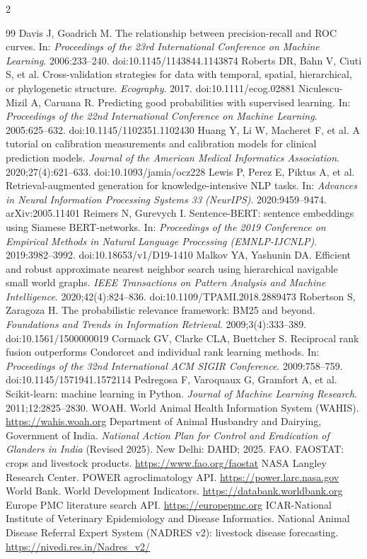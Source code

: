 \documentclass[10pt,openany]{report}
\begin{document}
\begin{multicols}{2}
\begin{thebibliography}{99}
 Davis J, Goadrich M. The relationship between precision-recall and ROC curves. In: \emph{Proceedings of the 23rd International Conference on Machine Learning}. 2006:233--240. doi:10.1145/1143844.1143874
 Roberts DR, Bahn V, Ciuti S, et al. Cross-validation strategies for data with temporal, spatial, hierarchical, or phylogenetic structure. \emph{Ecography}. 2017. doi:10.1111/ecog.02881
 Niculescu-Mizil A, Caruana R. Predicting good probabilities with supervised learning. In: \emph{Proceedings of the 22nd International Conference on Machine Learning}. 2005:625--632. doi:10.1145/1102351.1102430
 Huang Y, Li W, Macheret F, et al. A tutorial on calibration measurements and calibration models for clinical prediction models. \emph{Journal of the American Medical Informatics Association}. 2020;27(4):621--633. doi:10.1093/jamia/ocz228
 Lewis P, Perez E, Piktus A, et al. Retrieval-augmented generation for knowledge-intensive NLP tasks. In: \emph{Advances in Neural Information Processing Systems 33 (NeurIPS)}. 2020:9459--9474. arXiv:2005.11401
 Reimers N, Gurevych I. Sentence-BERT: sentence embeddings using Siamese BERT-networks. In: \emph{Proceedings of the 2019 Conference on Empirical Methods in Natural Language Processing (EMNLP-IJCNLP)}. 2019:3982--3992. doi:10.18653/v1/D19-1410
 Malkov YA, Yashunin DA. Efficient and robust approximate nearest neighbor search using hierarchical navigable small world graphs. \emph{IEEE Transactions on Pattern Analysis and Machine Intelligence}. 2020;42(4):824--836. doi:10.1109/TPAMI.2018.2889473
 Robertson S, Zaragoza H. The probabilistic relevance framework: BM25 and beyond. \emph{Foundations and Trends in Information Retrieval}. 2009;3(4):333--389. doi:10.1561/1500000019
 Cormack GV, Clarke CLA, Buettcher S. Reciprocal rank fusion outperforms Condorcet and individual rank learning methods. In: \emph{Proceedings of the 32nd International ACM SIGIR Conference}. 2009:758--759. doi:10.1145/1571941.1572114
 Pedregosa F, Varoquaux G, Gramfort A, et al. Scikit-learn: machine learning in Python. \emph{Journal of Machine Learning Research}. 2011;12:2825--2830.
 WOAH. World Animal Health Information System (WAHIS). \url{https://wahis.woah.org}
 Department of Animal Husbandry and Dairying, Government of India. \emph{National Action Plan for Control and Eradication of Glanders in India} (Revised 2025). New Delhi: DAHD; 2025.
 FAO. FAOSTAT: crops and livestock products. \url{https://www.fao.org/faostat}
 NASA Langley Research Center. POWER agroclimatology API. \url{https://power.larc.nasa.gov}
 World Bank. World Development Indicators. \url{https://databank.worldbank.org}
 Europe PMC literature search API. \url{https://europepmc.org}
 ICAR-National Institute of Veterinary Epidemiology and Disease Informatics. National Animal Disease Referral Expert System (NADRES v2): livestock disease forecasting. \url{https://nivedi.res.in/Nadres_v2/}
\end{thebibliography}
\end{multicols}
\end{document}

